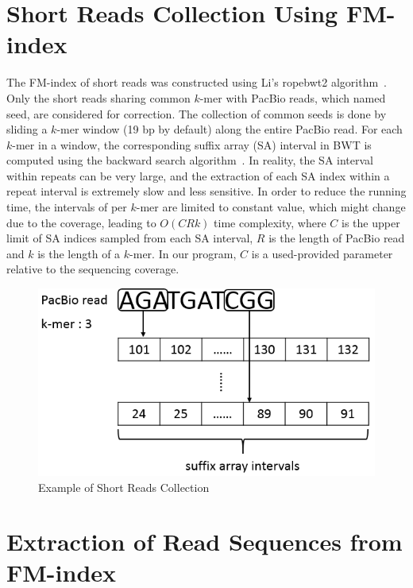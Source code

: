 \section{Short Reads Collection Using FM-index}


The FM-index of short reads was constructed using Li's ropebwt2 algorithm~\cite{pmid25107872}. Only the short reads sharing common $k$-mer with PacBio reads, which named seed, are considered for correction. The collection of common seeds is done by sliding a $k$-mer window (19 bp by default) along the entire PacBio read. For each $k$-mer in a window, the corresponding suffix array (SA) interval in BWT is computed using the backward search algorithm~\cite{pmid20529929}. In reality, the SA interval within repeats can be very large, and the extraction of each SA index within a repeat interval is extremely slow and less sensitive. In order to reduce the running time, the intervals of per $k$-mer are limited to constant value, which might change due to the coverage, leading to $O(CRk)$ time complexity, where $C$ is the upper limit of SA indices sampled from each SA interval, $R$ is the length of PacBio read and $k$ is the length of a $k$-mer. In our program, $C$ is a used-provided parameter relative to the sequencing coverage. 

\begin{figure} [h]
\centering
\includegraphics[scale=0.45]{Figures/chapter3/seed_identification.png}
\caption{Example of Short Reads Collection}
\label{Seed_Identification}
\end{figure}


\section{Extraction of Read Sequences from FM-index}

